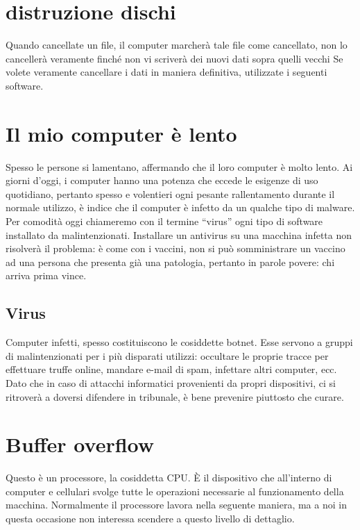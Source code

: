 \documentclass[italian,a4paper,12pt,oneside]{report}
\begin{document}
\section{distruzione dischi}
Quando cancellate un file, il computer marcherà tale file come cancellato, non
lo cancellerà veramente finché non vi scriverà dei nuovi dati sopra quelli vecchi
Se volete veramente cancellare i dati in maniera definitiva, utilizzate i
seguenti software.

\section{Il mio computer è lento}
Spesso le persone si lamentano, affermando che il loro computer è molto lento. Ai
giorni d'oggi, i computer hanno una potenza che eccede le esigenze di
uso quotidiano, pertanto spesso e volentieri ogni pesante rallentamento
durante il normale utilizzo, è indice che il computer è infetto da un qualche
tipo di malware. Per comodità oggi chiameremo con il termine ``virus'' ogni tipo
di software installato da malintenzionati. Installare un antivirus su una
macchina infetta non risolverà il problema: è come con i vaccini, non si può
somministrare un vaccino ad una persona che presenta già una patologia, pertanto
in parole povere: chi arriva prima vince.

\subsection{Virus}
Computer infetti, spesso costituiscono le cosiddette botnet. Esse servono a
gruppi di malintenzionati per i più disparati utilizzi: occultare le proprie
tracce per effettuare truffe online, mandare e-mail di spam, infettare altri
computer, ecc. Dato che in caso di attacchi informatici provenienti da propri
dispositivi, ci si ritroverà a doversi difendere in tribunale, è bene prevenire
piuttosto che curare.

\section{Buffer overflow}
Questo è un processore, la cosiddetta CPU. È il dispositivo che all'interno
di computer e cellulari svolge tutte le operazioni necessarie al funzionamento
della macchina. Normalmente il processore lavora nella seguente maniera, ma a
noi in questa occasione non interessa scendere a questo livello di dettaglio.
\end{document}
